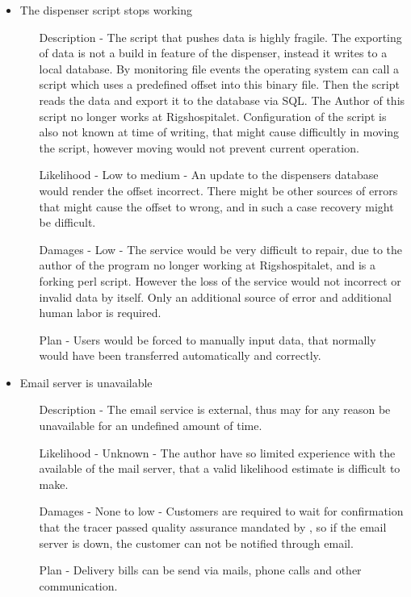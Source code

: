 \documentclass{article}
\begin{document}
\begin{itemize}
\begin{itemize}
  \end{itemize}
  \item The dispenser script stops working
  \begin{itemize}
    \item[Description] - The script that pushes data is highly fragile. The exporting of data is not a build in feature of the dispenser, instead it writes to a local database. By monitoring file events the operating system can call a script which uses a predefined offset into this binary file. Then the script reads the data and export it to the database via SQL. The Author of this script no longer works at Rigshospitalet. Configuration of the script is also not known at time of writing, that might cause difficultly in moving the script, however moving would not prevent current operation.
    \item[Likelihood] - Low to medium - An update to the dispensers database would render the offset incorrect. There might be other sources of errors that might cause the offset to wrong, and in such a case recovery might be difficult.
    \item[Damages] - Low - The service would be very difficult to repair, due to the author of the program no longer working at Rigshospitalet, and is a forking perl script.
    However the loss of the service would not incorrect or \gls{invalid data} by itself. Only an additional source of error and additional human labor is required.
    \item[Plan] - Users would be forced to manually input data, that normally would have been transferred automatically and correctly.
  \end{itemize}
  \item Email server is unavailable
  \begin{itemize}
    \item[Description] - The email service is external, thus may for any reason be unavailable for an undefined amount of time.
    \item[Likelihood] - Unknown - The author have so limited experience with the available of the mail server, that a valid likelihood estimate is difficult to make.
    \item[Damages] - None to low - Customers are required to wait for confirmation that the tracer passed quality assurance mandated by , so if the email server is down, the customer can not be notified through email.
    \item[Plan] - Delivery bills can be send via mails, phone calls and other communication.

\end{itemize}
\end{itemize}
\end{document}
